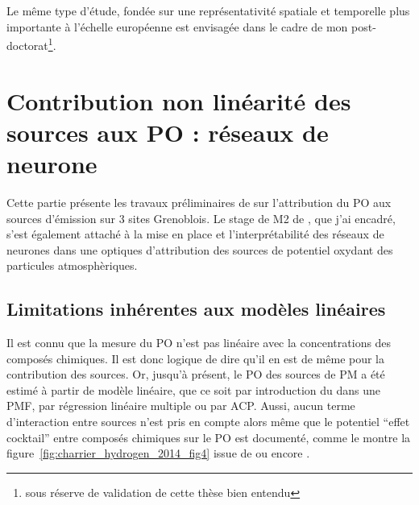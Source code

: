 Le même type d'étude, fondée sur une représentativité spatiale et temporelle plus
importante à l'échelle européenne est envisagée dans le cadre de mon
post-doctorat\footnote{sous réserve de validation de cette thèse bien entendu}.


\section{Contribution non linéarité des sources aux PO : réseaux de neurone}%
\label{sec:reseau_neurone}

\begin{tcolorbox}[colback=red!5!white,colframe=Melon,title=Note]
    Cette partie présente les travaux préliminaires de \cite{borlazaUrbaninprep.} sur 
    l'attribution du PO aux sources d'émission sur 3 sites Grenoblois. Le stage de M2 de
    \cite{fichesMachine2020}, que j'ai encadré, s'est également attaché à la mise en place et
    l'interprétabilité des réseaux de neurones dans une optiques d'attribution des sources
    de potentiel oxydant des particules atmosphèriques.
\end{tcolorbox}

\subsection{Limitations inhérentes aux modèles linéaires}%
\label{sub:limitations_inhérentes_aux_modèles_linéaires}


Il est connu que la mesure du PO n'est pas linéaire avec la concentrations des composés
chimiques. Il est donc logique de dire qu'il en est de même pour la contribution des
sources.
Or, jusqu'à présent, le PO des sources de PM a été estimé à partir de modèle linéaire,
que ce soit par introduction du \POv{} dans une PMF, par régression linéaire multiple ou
par ACP.
Aussi, aucun terme d'interaction entre sources n'est pris en compte alors même que
le potentiel ``effet cocktail'' entre composés chimiques sur le PO est documenté, comme le
montre la figure~\ref{fig:charrier_hydrogen_2014_fig4} issue de
\cite{charrierHydrogen2014} ou encore 
\cites[figure S7 du supplément]{charrierDithiothreitol2012}{xiongRethinking2017}{samakeUnexpected2017}.

